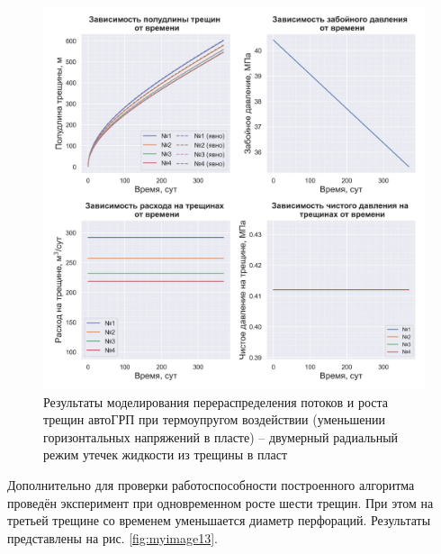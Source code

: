 \begin{figure}[H] 
\center
\includegraphics[width=\linewidth]{images/myimage12.jpg}
\caption{Результаты моделирования перераспределения потоков и роста трещин автоГРП при термоупругом воздействии (уменьшении горизонтальных напряжений в пласте) -- двумерный радиальный режим утечек жидкости из трещины в пласт}
\label{fig:myimage12}
\end{figure}

Дополнительно для проверки работоспособности построенного алгоритма проведён эксперимент при одновременном росте шести трещин.
При этом на третьей трещине со временем уменьшается диаметр перфораций.
Результаты представлены на рис. \ref{fig:myimage13}.


